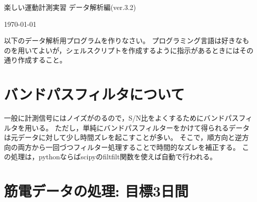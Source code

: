 \documentclass{jsarticle}
\def\version{3.2}
\begin{document}
\begin{center}
  {\LARGE 楽しい運動計測実習 データ解析編(ver.\version)}
\end{center}
\begin{flushright}
\today
\end{flushright}

以下のデータ解析用プログラムを作りなさい。
プログラミング言語は好きなものを用いてよいが，シェルスクリプトを作成するように指示があるときにはその通り作成すること。


\section{バンドパスフィルタについて}  
一般に計測信号にはノイズがのるので，S/N比をよくするためにバンドパスフィルタを用いる。
ただし，単純にバンドパスフィルターをかけて得られるデータは元データに対して少し時間ズレを起こすことが多い。
そこで，順方向と逆方向の両方から一回づつフィルター処理することで時間的なズレを補正する。
この処理は，pythonならばscipyのfiltfilt関数を使えば自動で行われる。

\section{筋電データの処理: 目標3日間}
\end{document}
